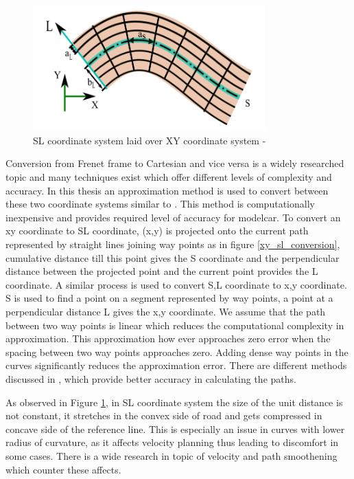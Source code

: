  \begin{figure}[H]
    \centering
    \includegraphics[width=0.8\textwidth]{Images/sl_over_xy.png}
    \caption{SL coordinate system laid over XY coordinate system - \cite{diss_shui_phd_thesis}}
    \label{sl_over_xy}
\end{figure}
 
 Conversion from Frenet frame to Cartesian and vice versa is a widely researched topic and many techniques exist which offer different levels of complexity and accuracy. In this thesis an approximation method is used to convert between these two coordinate systems similar to \cite{volvo_reactive_traj}. This method is computationally inexpensive and provides required level of accuracy for modelcar. To convert an xy coordinate to SL coordinate, (x,y) is projected onto the current path represented by straight lines joining way points as in figure \ref{xy_sl_conversion}, cumulative distance till this point gives the S coordinate and the perpendicular distance between the projected point and the current point provides the L coordinate. A similar process is used to convert S,L coordinate to x,y coordinate. S is used to find a point on a segment represented by way points, a point at a perpendicular distance L gives the x,y coordinate. We assume that the path between two way points is linear which reduces the computational complexity in approximation. This approximation how ever approaches zero error when the spacing between two way points approaches zero. Adding dense way points in the curves significantly reduces the approximation error. There are different methods discussed in \cite{lengthparameterized}, \cite{Wangrobustand} which provide better accuracy in calculating the paths. 
 
 As observed in Figure \ref{sl_over_xy}, in SL coordinate system the size of the unit distance is not constant, it stretches in the convex side of road and gets compressed in concave side of the reference line. This is especially an issue in curves with lower radius of curvature, as it affects velocity planning thus leading to discomfort in some cases. There is a wide research in topic of velocity and path smoothening which counter these affects. 
 
